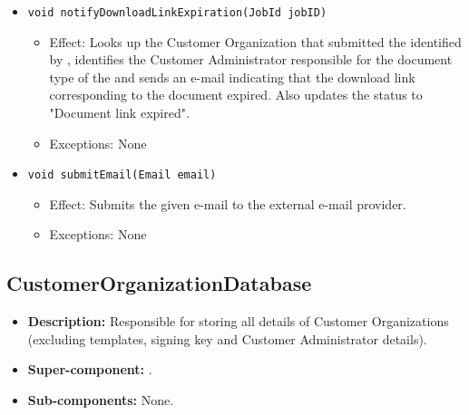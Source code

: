 \begin{itemize}
\begin{itemize}
		\item \texttt{void notifyDownloadLinkExpiration(JobId jobID)}
		    \begin{itemize}
                \item Effect: Looks up the Customer Organization that submitted the  identified by , identifies the Customer Administrator responsible for the document type of the  and sends an e-mail indicating that the download link corresponding to the document expired. Also updates the status to "Document link expired".
                \item Exceptions: None
            \end{itemize}

		\item \texttt{void submitEmail(Email email)}
        \begin{itemize}
            \item Effect: Submits the given e-mail to the external e-mail provider.
            \item Exceptions: None
        \end{itemize}
    \end{itemize}
\end{itemize}

\subsection{CustomerOrganizationDatabase}
\begin{itemize}
    \item \textbf{Description:} Responsible for storing all details of Customer Organizations (excluding templates, signing key and Customer Administrator details).
    \item \textbf{Super-component:} .
    \item \textbf{Sub-components:} None.
\end{itemize}

